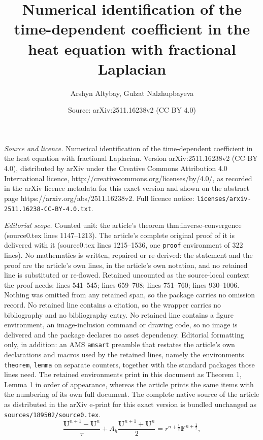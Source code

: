 \documentclass[10pt,a4paper]{amsart}
\title{Numerical identification of the time-dependent coefficient in the heat equation with fractional Laplacian}
\author{Arshyn Altybay, Gulzat Nalzhupbayeva}
\date{Source: arXiv:2511.16238v2 (CC BY 4.0)}
\newcommand{\Ah}{A_h}
\begin{document}
\maketitle

\noindent\emph{Source and licence.} Numerical identification of the time-dependent coefficient in the heat equation with fractional Laplacian. Version arXiv:2511.16238v2 (CC BY 4.0), distributed by arXiv under the Creative Commons Attribution 4.0 International licence, http://creativecommons.org/licenses/by/4.0/, as recorded in the arXiv licence metadata for this exact version and shown on the abstract page https://arxiv.org/abs/2511.16238v2. Full licence notice: \texttt{licenses/arxiv-2511.16238-CC-BY-4.0.txt}.\par\smallskip

\noindent\textit{Editorial scope.} Counted unit: the article's theorem thm:inverse-convergence (source0.tex lines 1147--1213). The article's complete original proof of it is delivered with it (source0.tex lines 1215--1536, one \texttt{proof} environment of 322 lines). No mathematics is written, repaired or re-derived: the statement and the proof are the article's own lines, in the article's own notation, and no retained line is substituted or re-flowed.  Retained uncounted as the source-local context the proof needs: lines 541--545; lines 659--708; lines 751--760; lines 930--1006.  Nothing was omitted from any retained span, so the package carries no omission record.  No retained line contains a citation, so the wrapper carries no bibliography and no bibliography entry.  No retained line contains a figure environment, an image-inclusion command or drawing code, so no image is delivered and the package declares no asset dependency.  Editorial formatting only, in addition: an AMS \texttt{amsart} preamble that restates the article's own declarations and macros used by the retained lines, namely the environments \texttt{theorem}, \texttt{lemma} on separate counters, together with the standard packages those lines need.  The retained environments print in this document as Theorem 1, Lemma 1 in order of appearance, whereas the article prints the same items with the numbering of its own full document.  The complete native source of the article as distributed in the arXiv e-print for this exact version is bundled unchanged as \texttt{sources/189502/source0.tex}.
\begin{equation}\label{fds_full}
 \frac{\mathbf U^{n+1}-\mathbf U^n}{\tau}
 +\Ah\frac{\mathbf U^{n+1}+\mathbf U^n}{2}
 =r^{n+\frac12}\mathbf F^{n+\frac12},
\end{equation}
\end{document}
